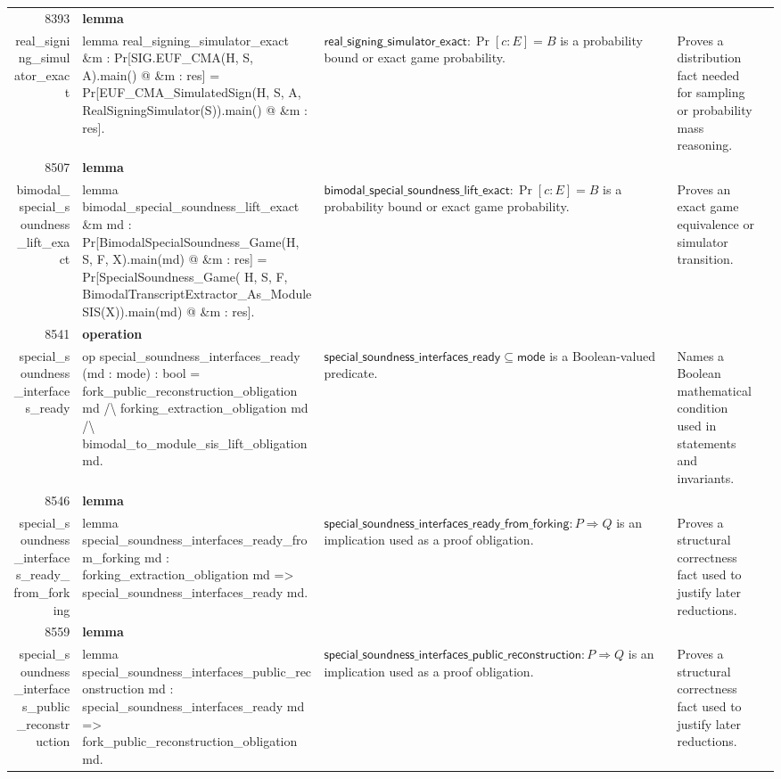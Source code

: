\documentclass[10pt]{article}
\newcommand{\ec}[1]{\begingroup\ttfamily\scriptsize #1\endgroup}
\begin{document}
\begin{longtable}{r L{0.17\textwidth} L{0.26\textwidth} L{0.27\textwidth} L{0.20\textwidth}}
8393 & \textbf{lemma}\\\ec{real\_signing\_simulator\_exact} & \ec{lemma real\_signing\_simulator\_exact \&m : Pr[SIG.EUF\_CMA(H, S, A).main() @ \&m : res] = Pr[EUF\_CMA\_SimulatedSign(H, S, A, RealSigningSimulator(S)).main() @ \&m : res].} & \(\mathsf{real\_signing\_simulator\_exact} : \Pr[c : E] = B\) is a probability bound or exact game probability. & Proves a distribution fact needed for sampling or probability mass reasoning. \\
8507 & \textbf{lemma}\\\ec{bimodal\_special\_soundness\_lift\_exact} & \ec{lemma bimodal\_special\_soundness\_lift\_exact \&m md : Pr[BimodalSpecialSoundness\_Game(H, S, F, X).main(md) @ \&m : res] = Pr[SpecialSoundness\_Game( H, S, F, BimodalTranscriptExtractor\_As\_ModuleSIS(X)).main(md) @ \&m : res].} & \(\mathsf{bimodal\_special\_soundness\_lift\_exact} : \Pr[c : E] = B\) is a probability bound or exact game probability. & Proves an exact game equivalence or simulator transition. \\
8541 & \textbf{operation}\\\ec{special\_soundness\_interfaces\_ready} & \ec{op special\_soundness\_interfaces\_ready (md : mode) : bool = fork\_public\_reconstruction\_obligation md /\textbackslash{} forking\_extraction\_obligation md /\textbackslash{} bimodal\_to\_module\_sis\_lift\_obligation md.} & \(\mathsf{special\_soundness\_interfaces\_ready} \subseteq \mathsf{mode}\) is a Boolean-valued predicate. & Names a Boolean mathematical condition used in statements and invariants. \\
8546 & \textbf{lemma}\\\ec{special\_soundness\_interfaces\_ready\_from\_forking} & \ec{lemma special\_soundness\_interfaces\_ready\_from\_forking md : forking\_extraction\_obligation md => special\_soundness\_interfaces\_ready md.} & \(\mathsf{special\_soundness\_interfaces\_ready\_from\_forking} : P \Rightarrow Q\) is an implication used as a proof obligation. & Proves a structural correctness fact used to justify later reductions. \\
8559 & \textbf{lemma}\\\ec{special\_soundness\_interfaces\_public\_reconstruction} & \ec{lemma special\_soundness\_interfaces\_public\_reconstruction md : special\_soundness\_interfaces\_ready md => fork\_public\_reconstruction\_obligation md.} & \(\mathsf{special\_soundness\_interfaces\_public\_reconstruction} : P \Rightarrow Q\) is an implication used as a proof obligation. & Proves a structural correctness fact used to justify later reductions. \\

\end{longtable}
\end{document}
